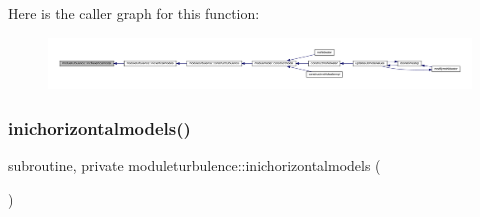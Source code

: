 Here is the caller graph for this function\+:\nopagebreak
\begin{figure}[H]
\begin{center}
\leavevmode
\includegraphics[width=350pt]{namespacemoduleturbulence_abccdbd06f5d7520144dadb5297887cfb_icgraph}
\end{center}
\end{figure}
\mbox{\label{namespacemoduleturbulence_a7d9753f3c1a5db2dfb55d80111926a99}} 
\subsubsection{\texorpdfstring{inichorizontalmodels()}{inichorizontalmodels()}}
{\footnotesize\ttfamily subroutine, private moduleturbulence\+::inichorizontalmodels (\begin{DoxyParamCaption}{ }\end{DoxyParamCaption})\hspace{0.3cm}{\ttfamily [private]}}

